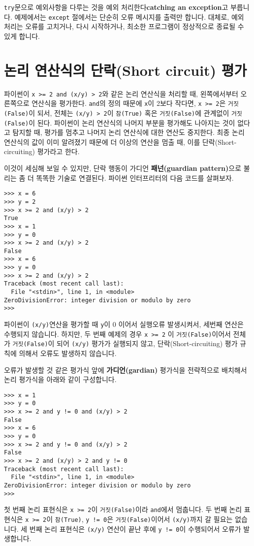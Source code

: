 {\tt try}문으로 예외사항을 다루는 것을 예외 처리한다{\bf catching an exception}고 부릅니다.
예제에서는 {\tt except} 절에서는 단순히 오류 메시지를 출력만 합니다. 대체로, 예외 처리는 오류를 고치거나, 다시 시작하거나, 최소한 프로그램이 정상적으로 종료될 수 있게 합니다.

\section{논리 연산식의 단락(Short circuit) 평가}

파이썬이 {\tt x >= 2 and (x/y) > 2}와 같은 논리 연산식을 처리할 때, 왼쪽에서부터 오른쪽으로 연산식을 평가한다.
{\tt and}의 정의 때문에 {\tt x}이 2보다 작다면, {\tt x >= 2}은 {\tt 거짓(False)}이 되서, 전체는 {\tt (x/y) > 2}이 {\tt 참(True)} 혹은 {\tt 거짓(False)}에 관계없이 {\tt 거짓(False)}이 된다. 
파이썬이 논리 연산식의 나머지 부분을 평가해도 나아지는 것이 없다고 탐지할 때, 평가를 멈추고 나머지 논리 연산식에 대한 연산도 중지한다. 최종 논리 연산식의 값이 이미 알려졌기 때문에
더 이상의 연산을 멈출 때, 이를 단락(Short-circuiting) 평가라고 한다.


이것이 세심해 보일 수 있지만, 단락 행동이 가디언 {\bf 패넌(guardian pattern)}으로 불리는 좀 더 똑똑한 기술로 연결된다.
파이썬 인터프리터의 다음 코드를 살펴보자.

\beforeverb
\begin{verbatim}
>>> x = 6 
>>> y = 2
>>> x >= 2 and (x/y) > 2
True
>>> x = 1 
>>> y = 0
>>> x >= 2 and (x/y) > 2
False
>>> x = 6
>>> y = 0
>>> x >= 2 and (x/y) > 2
Traceback (most recent call last):
  File "<stdin>", line 1, in <module>
ZeroDivisionError: integer division or modulo by zero
>>> 
\end{verbatim}
\afterverb
%
파이썬이 {\tt (x/y)}연산을 평가할 때 {\tt y}이 0 이어서 실행오류 발생시켜서, 세번째 연산은 수행되지 않습니다.
하지만, 두 번째 예제의 경우 {\tt x >= 2} 이 {\tt 거짓(False)}이어서 전체가 {\tt 거짓(False)}이 되어 {\tt (x/y)} 평가가 실행되지 않고,
단락(Short-circuiting) 평가 규칙에 의해서 오류도 발생하지 않습니다.

오류가 발생할 것 같은 평가식 앞에 {\bf 가디언(gardian)} 평가식을 전략적으로 배치해서 논리 평가식을 아래와 같이 구성합니다. 

\beforeverb
\begin{verbatim}
>>> x = 1
>>> y = 0
>>> x >= 2 and y != 0 and (x/y) > 2
False
>>> x = 6 
>>> y = 0
>>> x >= 2 and y != 0 and (x/y) > 2
False
>>> x >= 2 and (x/y) > 2 and y != 0
Traceback (most recent call last):
  File "<stdin>", line 1, in <module>
ZeroDivisionError: integer division or modulo by zero
>>>
\end{verbatim}
\afterverb
%
첫 번째 논리 표현식은 {\tt x >= 2}이 {\tt 거짓(False)}이라 {\tt and}에서 멈춥니다.
두 번째 논리 표현식은 {\tt x >= 2}이 {\tt 참(True)}, {\tt y != 0}은 {\tt 거짓(False)}이어서 {\tt (x/y)}까지 갈 필요는 없습니다.
세 번째 논리 표현식은 {\tt (x/y)} 연산이 끝난 후에 {\tt y != 0}이 수행되어서 오류가 발생합니다.


